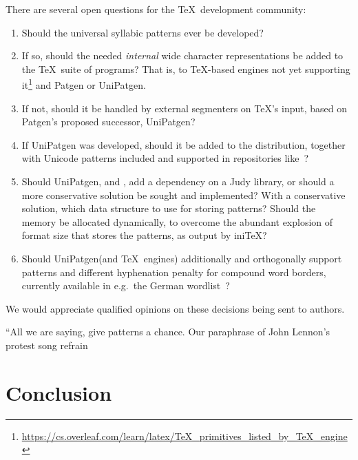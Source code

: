 \documentclass{csbulletin}
\let\stress=\emph
\let\program=\textrm %
\newcommand{\Patgen}{\program{Patgen}\xspace}
\newcommand{\XPatgen}{\program{UniPatgen}\xspace}
\newcommand\motto[3]{\vspace{#1\baselineskip}\pagebreak[3]
\begin{flushright}\small#3
\end{flushright}%
\vspace*{#2\baselineskip}%
}
\begin{document}
There are several open questions for the \TeX\ development community:
\begin{enumerate}
    \item Should the universal syllabic patterns ever be developed?
    \item %
    If so, should the needed \stress{internal} wide character representations be added to the \TeX\ suite of programs?
    That is, to \TeX-based engines not yet supporting it\footnote{\raggedright\url{https://cs.overleaf.com/learn/latex/TeX_primitives_listed_by_TeX_engine}} and \Patgen or \XPatgen.
    \item If not, should it be handled by external segmenters on \TeX's input, based on \Patgen's proposed successor, \XPatgen?
    \item If \XPatgen was developed, should it be added to the distribution, together with Unicode patterns included and supported in repositories like~\cite{tex:hyphenationweb-2023-07-05}?
    \item Should \XPatgen, and \LuaTeX, add a dependency on a Judy library, or should a more conservative solution be sought and implemented?
    With a conservative solution, which data structure to use for storing patterns?
    Should the memory be allocated dynamically, to overcome the abundant explosion of format size that stores the patterns, as output by ini\TeX? 
    \item Should \XPatgen (and \TeX\ engines) additionally and orthogonally support patterns and different hyphenation penalty for compound word borders, currently available in e.g.\ the German wordlist~\cite{nlp:Germantrennmuster}?
\end{enumerate}
We would appreciate qualified opinions on these decisions being sent to authors.



\motto{1}{-2.2}{\hfill``All we are saying, give patterns a chance.\rlap{''}\newline
Our paraphrase of John Lennon's protest song refrain}

\section{Conclusion}
\label{sec:conclusion}
\end{document}
